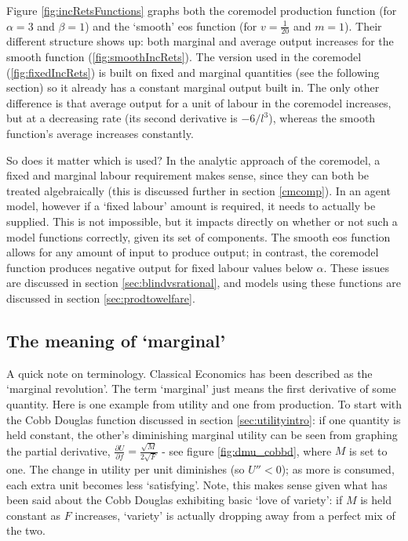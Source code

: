 Figure \ref{fig:incRetsFunctions} graphs both the \gls{coremodel} production function (for $\alpha =3$ and $\beta = 1$) and the `smooth' \gls{eos} function (for $v = \frac{1}{20}$ and $m = 1$). Their different structure shows up: both marginal and average output increases for the smooth function (\ref{fig:smoothIncRets}). The version used in the \gls{coremodel} (\ref{fig:fixedIncRets}) is built on fixed and marginal quantities (see the following section) so it already has a constant marginal output built in. The only other difference is that average output for a unit of labour in the \gls{coremodel} increases, but at a decreasing rate (its second derivative is $-6/l^3$), whereas the smooth function's average increases constantly.

So does it matter which is used? In the analytic approach of the \gls{coremodel}, a fixed and marginal labour requirement makes sense, since they can both be treated algebraically (this is discussed further in section \ref{cmcomp}). In an agent model, however if a `fixed labour' amount is required, it needs to actually be supplied. This is not impossible, but it impacts directly on whether or not such a model functions correctly, given its set of components. The smooth \gls{eos} function allows for any amount of input to produce output; in contrast, the \gls{coremodel} function produces negative output for fixed labour values below $\alpha$. These issues are discussed in section \ref{sec:blindvsrational}, and models using these functions are discussed in section \ref{sec:prodtowelfare}.

\subsection{The meaning of `marginal' \label{sec:marginalapx}}

A quick note on terminology. Classical Economics has been described as the `marginal revolution'. The term `marginal' just means the first derivative of some quantity. Here is one example from utility and one from production. To start with the Cobb Douglas function discussed in section \ref{sec:utilityintro}: if one quantity is held constant, the other's diminishing marginal utility can be seen from graphing the partial derivative, $\frac{\partial U}{\partial f}=\frac{\sqrt{M}}{2\sqrt{F}}$ - see figure \ref{fig:dmu_cobbd}, where $M$ is set to one. The change in utility per unit diminishes (so $U''<0$); as more is consumed, each extra unit becomes less `satisfying'. Note, this makes sense given what has been said about the Cobb Douglas exhibiting basic `love of variety': if $M$ is held constant as $F$ increases, `variety' is actually dropping away from a perfect mix of the two.

